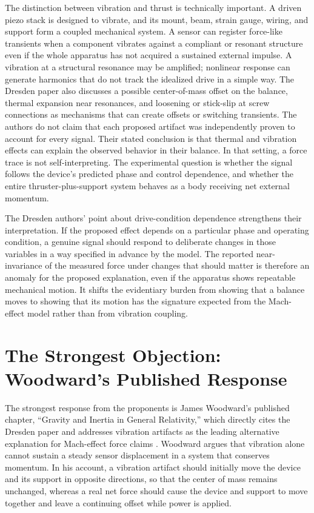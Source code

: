 \documentclass[11pt]{article}
\begin{document}
The distinction between vibration and thrust is technically important. A driven piezo stack is designed to vibrate, and its mount, beam, strain gauge, wiring, and support form a coupled mechanical system. A sensor can register force-like transients when a component vibrates against a compliant or resonant structure even if the whole apparatus has not acquired a sustained external impulse. A vibration at a structural resonance may be amplified; nonlinear response can generate harmonics that do not track the idealized drive in a simple way. The Dresden paper also discusses a possible center-of-mass offset on the balance, thermal expansion near resonances, and loosening or stick-slip at screw connections as mechanisms that can create offsets or switching transients. The authors do not claim that each proposed artifact was independently proven to account for every signal. Their stated conclusion is that thermal and vibration effects can explain the observed behavior in their balance. In that setting, a force trace is not self-interpreting. The experimental question is whether the signal follows the device's predicted phase and control dependence, and whether the entire thruster-plus-support system behaves as a body receiving net external momentum.

The Dresden authors' point about drive-condition dependence strengthens their interpretation. If the proposed effect depends on a particular phase and operating condition, a genuine signal should respond to deliberate changes in those variables in a way specified in advance by the model. The reported near-invariance of the measured force under changes that should matter is therefore an anomaly for the proposed explanation, even if the apparatus shows repeatable mechanical motion. It shifts the evidentiary burden from showing that a balance moves to showing that its motion has the signature expected from the Mach-effect model rather than from vibration coupling.

\section{The Strongest Objection: Woodward's Published Response}

The strongest response from the proponents is James Woodward's published chapter, ``Gravity and Inertia in General Relativity,'' which directly cites the Dresden paper and addresses vibration artifacts as the leading alternative explanation for Mach-effect force claims \cite{Woodward2021}. Woodward argues that vibration alone cannot sustain a steady sensor displacement in a system that conserves momentum. In his account, a vibration artifact should initially move the device and its support in opposite directions, so that the center of mass remains unchanged, whereas a real net force should cause the device and support to move together and leave a continuing offset while power is applied.
\end{document}
